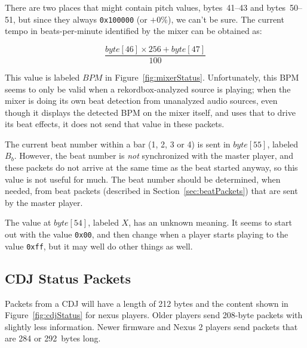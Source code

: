 \documentclass[11pt]{article}
\begin{document}
There are two places that might contain pitch values, bytes~41--43 and
bytes~50--51, but since they always {\tt 0x100000} (or $+0\%$), we
can't be sure. The current tempo in beats-per-minute identified by the
mixer can be obtained as:

\[ \frac{byte[46] \times 256 + byte[47]}{100} \]

This value is labeled $BPM$ in Figure~\ref{fig:mixerStatus}.
Unfortunately, this BPM seems to only be valid when a
rekordbox-analyzed source is playing; when the mixer is doing its own
beat detection from unanalyzed audio sources, even though it displays
the detected BPM on the mixer itself, and uses that to drive its beat
effects, it does not send that value in these packets.

The current beat number within a bar (1, 2, 3 or 4) is sent in
$byte[55]$, labeled $B_b$. However, the beat number is \emph{not}
synchronized with the master player, and these packets do not arrive
at the same time as the beat started anyway, so this value is not
useful for much. The beat number should be determined, when needed,
from beat packets (described in Section~\ref{sec:beatPackets}) that
are sent by the master player.

The value at $byte[54]$, labeled $X$, has an unknown meaning. It
seems to start out with the value {\tt 0x00}, and then change when a
player starts playing to the value {\tt 0xff}, but it may well do
other things as well.

\subsection{CDJ Status Packets}

Packets from a CDJ will have a length of 212 bytes and the content
shown in Figure~\ref{fig:cdjStatus} for nexus players. Older players
send 208-byte packets with slightly less information. Newer firmware
and Nexus 2 players send packets that are 284 or 292~bytes long.
\end{document}
